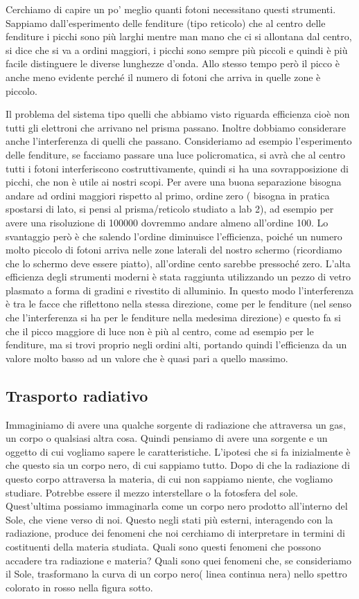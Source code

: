 \documentclass[a4paper,11pt]{article}
\begin{document}
        Cerchiamo di capire un po' meglio quanti fotoni necessitano questi strumenti. Sappiamo dall'esperimento delle fenditure (tipo reticolo) che al centro delle fenditure i picchi sono più larghi mentre man mano che ci si allontana dal centro, si dice che si va a ordini maggiori, i picchi sono sempre più piccoli e quindi è più facile distinguere le diverse lunghezze d'onda. Allo stesso tempo però il picco è anche meno evidente perché il numero di fotoni che arriva in quelle zone è piccolo. 
        
        Il problema del sistema tipo quelli che abbiamo visto riguarda efficienza cioè non tutti gli elettroni che arrivano nel prisma passano. Inoltre dobbiamo considerare anche l'interferenza di quelli che passano. Consideriamo ad esempio l'esperimento delle fenditure, se facciamo passare una luce policromatica, si avrà che al centro tutti i fotoni interferiscono costruttivamente, quindi si ha una sovrapposizione di picchi, che non è utile ai nostri scopi. Per avere una buona separazione bisogna andare ad ordini maggiori rispetto al primo, ordine zero ( bisogna in pratica spostarsi di lato, si pensi al prisma/reticolo studiato a lab 2), ad esempio per avere una risoluzione di 100000 dovremmo andare almeno all'ordine 100. Lo svantaggio però è che salendo l'ordine diminuisce l'efficienza, poiché un numero molto piccolo di fotoni arriva nelle zone laterali del nostro schermo (ricordiamo che lo schermo deve essere piatto), all'ordine cento sarebbe pressoché zero. L'alta efficienza degli strumenti moderni è stata raggiunta utilizzando un pezzo di vetro plasmato a forma di gradini e rivestito di alluminio. In questo modo l'interferenza è tra le facce che riflettono nella stessa direzione, come per le fenditure (nel senso che l'interferenza si ha per le fenditure nella medesima direzione) e questo fa si che il picco maggiore di luce non è più al centro, come ad esempio per le fenditure, ma si trovi proprio negli ordini alti, portando quindi l'efficienza da un valore molto basso ad un valore che è quasi pari a quello massimo.
        
        \subsection{Trasporto radiativo}
        Immaginiamo di avere una qualche sorgente di radiazione che attraversa un gas, un corpo o qualsiasi altra cosa. Quindi pensiamo di avere una sorgente e un oggetto di cui vogliamo sapere le caratteristiche. L'ipotesi che si fa inizialmente è che questo sia un corpo nero, di cui sappiamo tutto. Dopo di che la radiazione di questo corpo attraversa la materia, di cui non sappiamo niente, che vogliamo studiare. Potrebbe essere il mezzo interstellare o la fotosfera del sole. Quest'ultima possiamo immaginarla come un corpo nero prodotto all'interno del Sole, che viene verso di noi. Questo negli stati più esterni, interagendo con la radiazione, produce  dei fenomeni che noi cerchiamo di interpretare in termini di costituenti della materia studiata. Quali sono questi fenomeni che possono accadere tra radiazione e materia? Quali sono quei fenomeni che, se consideriamo il Sole, trasformano la curva di un corpo nero( linea continua nera) nello spettro colorato in rosso nella figura sotto.
        
\end{document}
